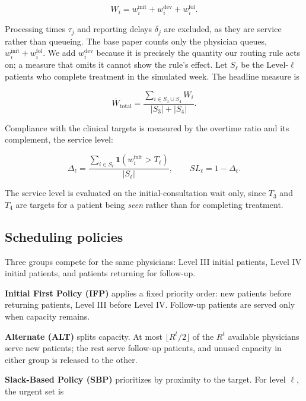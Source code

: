 \documentclass[sigconf]{acmart}
\newcommand{\Wtot}{\overline{W}_{\text{total}}}
\begin{document}
\begin{equation}
W_i=w^{\mathrm{init}}_i+w^{\mathrm{dev}}_i+w^{\mathrm{fol}}_i .
\label{eq:wait}
\end{equation}

Processing times $\tau_j$ and reporting delays $\delta_j$ are excluded, as they
are service rather than queueing. The base paper counts only the physician
queues, $w^{\mathrm{init}}_i+w^{\mathrm{fol}}_i$. We add $w^{\mathrm{dev}}_i$
because it is precisely the quantity our routing rule acts on; a measure that
omits it cannot show the rule's effect. Let $S_\ell$ be the Level-$\ell$
patients who complete treatment in the simulated week. The headline measure is

\begin{equation}
\Wtot=\frac{\sum_{i\in S_3\cup S_4} W_i}{|S_3|+|S_4|}.
\label{eq:wtot}
\end{equation}

Compliance with the clinical targets is measured by the overtime ratio and its
complement, the service level:

\begin{equation}
\Delta_\ell=\frac{\sum_{i\in S_\ell}\mathbf{1}\!\left(w^{\mathrm{init}}_i>T_\ell\right)}{|S_\ell|},
\qquad
SL_\ell=1-\Delta_\ell .
\label{eq:sl}
\end{equation}

The service level is evaluated on the initial-consultation wait only, since
$T_3$ and $T_4$ are targets for a patient being \emph{seen} rather than for
completing treatment.

\subsection{Scheduling policies}
\label{sec:scheduling}

Three groups compete for the same physicians: Level III initial patients, Level
IV initial patients, and patients returning for follow-up.

\textbf{Initial First Policy (IFP)} applies a fixed priority order: new
patients before returning patients, Level III before Level IV. Follow-up
patients are served only when capacity remains.

\textbf{Alternate (ALT)} splits capacity. At most $\lfloor R^t/2 \rfloor$ of the
$R^t$ available physicians serve new patients; the rest serve follow-up
patients, and unused capacity in either group is released to the other.

\textbf{Slack-Based Policy (SBP)} prioritizes by proximity to the target. For
level $\ell$, the urgent set is
\end{document}
